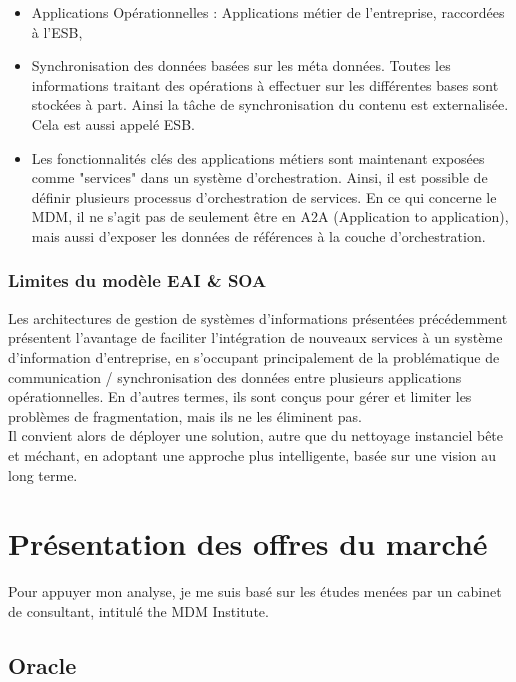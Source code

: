 \begin{itemize}

\item Applications Opérationnelles : Applications métier de l'entreprise, raccordées à l'ESB, 

\item Synchronisation des données basées sur les méta données. Toutes les informations traitant  des opérations à effectuer sur les différentes bases sont stockées à part. Ainsi la tâche de synchronisation du contenu est externalisée. Cela est aussi appelé ESB.

\item Les fonctionnalités clés des applications métiers sont maintenant exposées  comme "services" dans un système d'orchestration. Ainsi, il est possible de définir plusieurs processus d'orchestration de services. En ce qui concerne le MDM, il ne s'agit pas de seulement être en A2A (Application to application), mais aussi d'exposer les données de références à la couche d'orchestration.

\end{itemize}

\subsubsection{Limites du modèle EAI \& SOA}

Les architectures de gestion de systèmes d'informations présentées précédemment présentent l'avantage de faciliter l'intégration de nouveaux services à un système d'information d'entreprise, en s'occupant principalement de la problématique de communication / synchronisation des données entre plusieurs applications opérationnelles. En d'autres termes, ils sont conçus pour gérer et limiter les problèmes de fragmentation, mais ils ne les éliminent pas.\\
Il convient alors de déployer une solution, autre que du nettoyage instanciel bête et méchant, en adoptant une approche plus intelligente, basée sur une vision au long terme. 

\section{Présentation des offres du marché}

Pour appuyer mon analyse, je me suis basé sur les études menées par un cabinet de consultant, intitulé the MDM Institute.

\subsection{Oracle}

